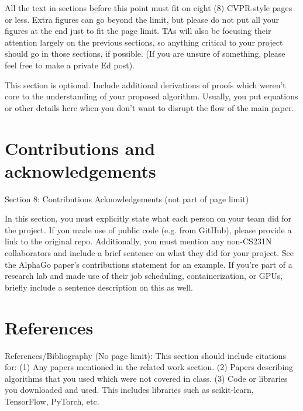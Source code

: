 \documentclass[10pt,twocolumn,letterpaper]{article}
\begin{document}
All the text in sections before this point must fit on eight (8) CVPR-style pages or less. Extra figures can go beyond the limit, but please do not put all your figures at the end just to fit the page limit. TAs will also be focusing their attention largely on the previous sections, so anything critical to your project should go in those sections, if possible. (If you are unsure of something, please feel free to make a private Ed post).

This section is optional. Include additional derivations of proofs which weren’t core to the understanding of your proposed algorithm. Usually, you put equations or other details here when you don’t want to disrupt the flow of the main paper.

\section{Contributions and acknowledgements}
\label{sec:contrib}
Section 8: Contributions Acknowledgements (not part of page limit)

In this section, you must explicitly state what each person on your team did for the project. If you made use of public code (e.g. from GitHub), please provide a link to the original repo. Additionally, you must mention any non-CS231N collaborators and include a brief sentence on what they did for your project. See the AlphaGo paper’s contributions statement for an example. If you’re part of a research lab and made use of their job scheduling, containerization, or GPUs, briefly include a sentence description on this as well.


\section{References}
\label{sec:references}
References/Bibliography (No page limit): This section should include citations for: (1) Any papers mentioned in the related work section. (2) Papers describing algorithms that you used which were not covered in class. (3) Code or libraries you downloaded and used. This includes libraries such as scikit-learn, TensorFlow, PyTorch, etc. 


{\small


}
\end{document}
